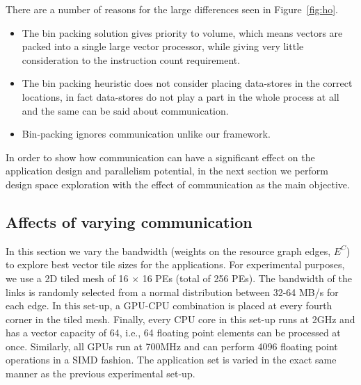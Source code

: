 There are a number of reasons for the large differences seen in
Figure~\ref{fig:ho}.

\begin{itemize}

\item The bin packing solution gives priority to volume, which means
  vectors are packed into a single large vector processor, while giving
  very little consideration to the instruction count requirement.

\item The bin packing heuristic does not consider placing data-stores in
  the correct locations, in fact data-stores do not play a part in the
  whole process at all and the same can be said about communication.

\item Bin-packing ignores communication unlike our framework.

\end{itemize}

In order to show how communication can have a significant
effect on the application design and parallelism potential, in the next
section we perform design space exploration with the effect
of communication as the main objective.


\subsection{Affects of varying communication}
\label{sec:arch-expl-with}


In this section we vary the bandwidth (weights on the resource graph
edges, $E^C$) to explore best vector tile sizes for the applications.
For experimental purposes, we use a 2D tiled mesh of 16 $\times$ 16 PEs
(total of 256 PEs). The bandwidth of the links is randomly selected from
a normal distribution between 32-64 MB/s for each edge. In this set-up,
a GPU-CPU combination is placed at every fourth corner in the tiled
mesh. Finally, every CPU core in this set-up runs at 2GHz and has a
vector capacity of 64, i.e., 64 floating point elements can be processed
at once. Similarly, all GPUs run at 700MHz and can perform 4096 floating
point operations in a SIMD fashion. The application set is varied in the
exact same manner as the previous experimental set-up.


